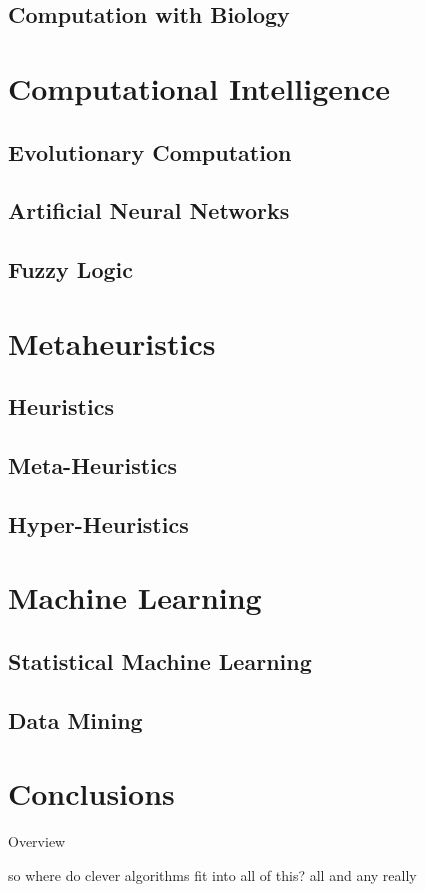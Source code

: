 \documentclass[a4paper, 11pt]{article}
\begin{document}
\subsection{Computation with Biology}


% 
% 
\section{Computational Intelligence}
\label{sec:computationl_intelligence}

\subsection{Evolutionary Computation}

\subsection{Artificial Neural Networks}

\subsection{Fuzzy Logic}

% 
% 
\section{Metaheuristics}
\label{sec:metaheuristics}

\subsection{Heuristics}

\subsection{Meta-Heuristics}

\subsection{Hyper-Heuristics}


% 
% 
\section{Machine Learning}
\label{sec:machine_learning}

\subsection{Statistical Machine Learning}

\subsection{Data Mining}


\section{Conclusions}
\label{sec:conclusions}
Overview

so where do clever algorithms fit into all of this?
all and any really




\end{document}
